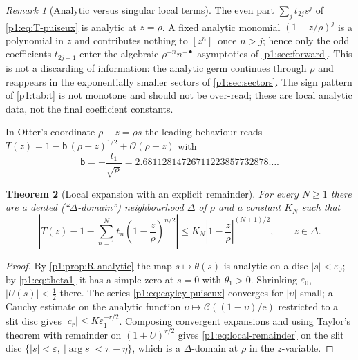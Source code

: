 \documentclass[11pt,a4paper,oneside]{book}
\theoremstyle{plain}
\newtheorem{theorem}{Theorem}[chapter]
\theoremstyle{definition}
\theoremstyle{remark}
\newtheorem{remark}[theorem]{Remark}
\newcommand{\e}{\mathrm{e}}
\newcommand{\Coef}[1]{[#1]\,}
\newcommand{\bigO}{\mathcal{O}}
\begin{document}
\begin{remark}[Analytic versus singular local terms]
\label{p1:rem:even-odd}
The even part $\sum_jt_{2j}s^{j}$ of \cref{p1:eq:T-puiseux} is analytic at $z=\rho$.  A fixed
analytic monomial $(1-z/\rho)^{j}$ is a polynomial in $z$ and contributes nothing to
$\Coef{z^n}$ once $n>j$; hence only the odd coefficients $t_{2j+1}$ enter the algebraic
$\rho^{-n}n^{-\bullet}$ asymptotics of \cref{p1:sec:forward}.  This is not a discarding of
information: the analytic germ continues through $\rho$ and reappears in the exponentially
smaller sectors of \cref{p1:sec:sectors}.  The sign pattern of \cref{p1:tab:t} is not monotone
and should not be over-read; these are local analytic data, not the final coefficient
constants.
\end{remark}

In Otter's coordinate $\rho-z=\rho s$ the leading behaviour reads $T(z)=1-\mathsf
b\,(\rho-z)^{1/2}+\bigO(\rho-z)$ with
\begin{equation}
 \mathsf b=-\frac{t_1}{\sqrt\rho}=2.68112814726711223857732878\ldots .
 \label{p1:eq:otter-b}
\end{equation}

\begin{theorem}[Local expansion with an explicit remainder]
\label{p1:thm:local-remainder}
For every $N\ge1$ there are a dented (``$\Delta$-domain'') neighbourhood $\Delta$ of $\rho$
and a constant $K_N$ such that
\begin{equation}
 \left|T(z)-1-\sum_{n=1}^{N}t_n\left(1-\frac z\rho\right)^{n/2}\right|
 \le K_N\left|1-\frac z\rho\right|^{(N+1)/2},
 \qquad z\in\Delta .
 \label{p1:eq:local-remainder}
\end{equation}
\end{theorem}

\begin{proof}
By \cref{p1:prop:R-analytic} the map $s\mapsto\theta(s)$ is analytic on a disc
$|s|<\varepsilon_0$; by \cref{p1:eq:theta1} it has a simple zero at $s=0$ with $\theta_1>0$.
Shrinking $\varepsilon_0$, $|U(s)|<\tfrac12$ there. The series \cref{p1:eq:cayley-puiseux}
converges for $|\upsilon|$ small; a Cauchy estimate on the analytic function $\upsilon\mapsto
\mathcal C((1-\upsilon)/\e)$ restricted to a slit disc gives $|c_r|\le K\varepsilon_1^{-r/2}$.
Composing convergent expansions and using Taylor's theorem with remainder on $(1+U)^{r/2}$
gives \cref{p1:eq:local-remainder} on the slit disc $\{|s|<\varepsilon,\ |\arg s|<\pi-\eta\}$,
which is a $\Delta$-domain at $\rho$ in the $z$-variable.
\end{proof}
\end{document}
